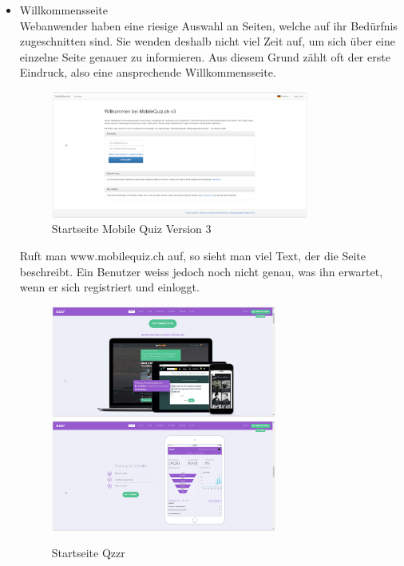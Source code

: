 	\begin{itemize}
		\item Willkommensseite \\
		Webanwender haben eine riesige Auswahl an Seiten, welche auf ihr Bedürfnis zugeschnitten sind. Sie wenden deshalb nicht viel Zeit auf, um sich über eine einzelne Seite genauer zu informieren. Aus diesem Grund zählt oft der erste Eindruck, also eine ansprechende Willkommensseite. \\
		
		\begin{figure}[h]
			\centering
			\includegraphics[width=0.8\textwidth]{Images/MobileQuiz_StartPage.PNG}
			\caption{Startseite Mobile Quiz Version 3}
		\end{figure}
		
		Ruft man www.mobilequiz.ch auf, so sieht man viel Text, der die Seite beschreibt. Ein Benutzer weiss jedoch noch nicht genau, was ihn erwartet, wenn er sich registriert und einloggt.
		
		\begin{figure}[h]
			\centering
			\includegraphics[width=0.7\textwidth]{Images/Qzzr_StartPage.PNG}
			\includegraphics[width=0.7\textwidth]
			{Images/Qzzr_StartPage_Statistics.PNG}
			\caption{Startseite Qzzr}
		\end{figure}
				

\end{itemize}
